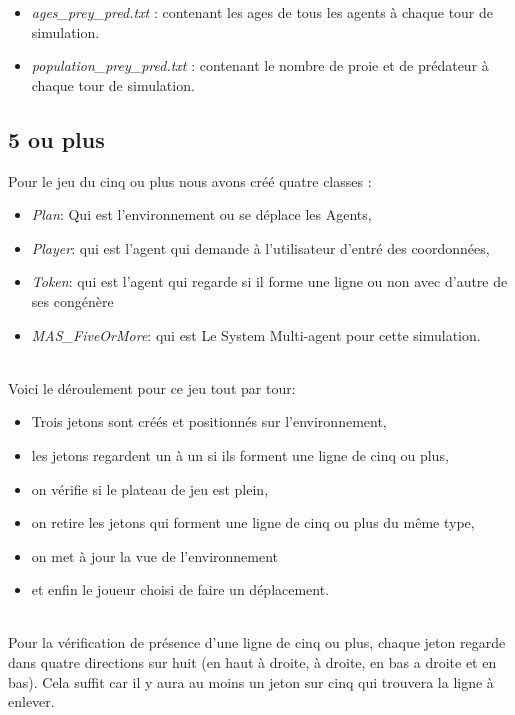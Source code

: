 \documentclass[a4paper,10pt]{article}
\begin{document}
\begin{itemize}
\item \emph{ages\_prey\_pred.txt} : contenant les ages de tous les agents \`a chaque tour de simulation.
\item \emph{population\_prey\_pred.txt} : contenant le nombre de proie et de pr\'edateur \`a chaque tour de simulation.
\end{itemize}

\newpage

\subsection{5 ou plus}

Pour le jeu du cinq ou plus nous avons cr\'e\'e quatre classes : \\ 

\begin{itemize}
\item \emph{Plan}: Qui est l'environnement ou se d\'eplace les Agents,
\item \emph{Player}: qui est l'agent qui demande \`a l'utilisateur d'entr\'e des coordonn\'ees,
\item \emph{Token}: qui est l'agent qui regarde si il forme une ligne ou non avec d'autre de ses cong\'en\`ere
\item \emph{MAS\_FiveOrMore}: qui est Le System Multi-agent pour cette simulation.
\end{itemize}
~\\

Voici le d\'eroulement pour ce jeu tout par tour: \\

\begin{itemize}
\item Trois jetons sont cr\'e\'es et positionn\'es sur l'environnement,
\item les jetons regardent un \`a un si ils forment une ligne de cinq ou plus,
\item on v\'erifie si le plateau de jeu est plein,
\item on retire les jetons qui forment une ligne de cinq ou plus du m\^eme type,
\item on met \`a jour la vue de l'environnement
\item et enfin le joueur choisi de faire un d\'eplacement.
\end{itemize} ~\\

Pour la v\'erification de pr\'esence d'une ligne de cinq ou plus, chaque jeton regarde dans quatre directions sur huit (en haut \`a droite, \`a droite, en bas a droite et en bas). Cela suffit car il y aura au moins un jeton sur cinq qui trouvera la ligne \`a enlever. \\
\end{document}
